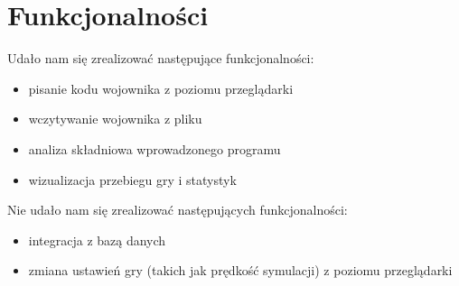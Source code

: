 \chapter{Funkcjonalności}
Udało nam się zrealizować następujące funkcjonalności:
\begin{itemize}
\item pisanie kodu wojownika z poziomu przeglądarki
\item wczytywanie wojownika z pliku
\item analiza składniowa wprowadzonego programu
\item wizualizacja przebiegu gry i statystyk
\end{itemize}
Nie udało nam się zrealizować następujących funkcjonalności:
\begin{itemize}
\item integracja z bazą danych
\item zmiana ustawień gry (takich jak prędkość symulacji) z poziomu przeglądarki
\end{itemize}